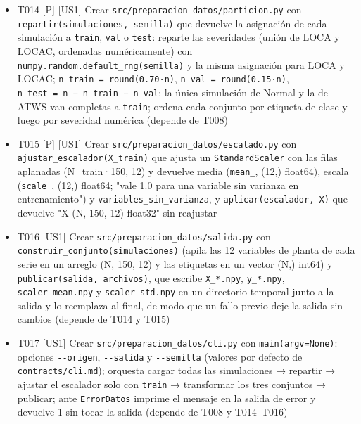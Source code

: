 \documentclass[12pt,a4paper]{article}
\providecommand{\tightlist}{\setlength{\itemsep}{0pt}\setlength{\parskip}{0pt}}
\newenvironment{documentogenerado}[2]{%
  \def\doccomando{#1}\def\docruta{#2}%
  \par\begingroup\small\setstretch{1.15}\sloppy%
}{\endgroup\par\medskip}
\begin{document}
\begin{documentogenerado}{/speckit-tasks (fase 7: /speckit-converge)}{specs\slash 001-preparacion-datos\slash tasks.md}
\begin{itemize}
\tightlist
\item[$\boxtimes$]
  T014 {[}P{]} {[}US1{]} Crear \texttt{src/\allowbreak{}preparacion\_\allowbreak{}datos/\allowbreak{}particion.\allowbreak{}py} con \texttt{repartir(simulaciones,\ semilla)} que devuelve la asignación de cada simulación a \texttt{train}, \texttt{val} o \texttt{test}: reparte las severidades (unión de LOCA y LOCAC, ordenadas numéricamente) con \texttt{numpy.\allowbreak{}random.\allowbreak{}default\_\allowbreak{}rng(semilla)} y la misma asignación para LOCA y LOCAC; \texttt{n\_\allowbreak{}train\ =\allowbreak{}\ round(0.\allowbreak{}70·n)}, \texttt{n\_\allowbreak{}val\ =\allowbreak{}\ round(0.\allowbreak{}15·n)}, \texttt{n\_\allowbreak{}test\ =\allowbreak{}\ n\ −\ n\_\allowbreak{}train\ −\ n\_\allowbreak{}val}; la única simulación de Normal y la de ATWS van completas a \texttt{train}; ordena cada conjunto por etiqueta de clase y luego por severidad numérica (depende de T008)
\item[$\boxtimes$]
  T015 {[}P{]} {[}US1{]} Crear \texttt{src/\allowbreak{}preparacion\_\allowbreak{}datos/\allowbreak{}escalado.\allowbreak{}py} con \texttt{ajustar\_\allowbreak{}escalador(X\_\allowbreak{}train)} que ajusta un \texttt{StandardScaler} con las filas aplanadas (N\_train·150, 12) y devuelve media (\texttt{mean\_}, (12,) float64), escala (\texttt{scale\_}, (12,) float64; "vale 1.0 para una variable sin varianza en entrenamiento") y \texttt{variables\_\allowbreak{}sin\_\allowbreak{}varianza}, y \texttt{aplicar(escalador,\ X)} que devuelve "X (N, 150, 12) float32" sin reajustar
\item[$\boxtimes$]
  T016 {[}US1{]} Crear \texttt{src/\allowbreak{}preparacion\_\allowbreak{}datos/\allowbreak{}salida.\allowbreak{}py} con \texttt{construir\_\allowbreak{}conjunto(simulaciones)} (apila las 12 variables de planta de cada serie en un arreglo (N, 150, 12) y las etiquetas en un vector (N,) int64) y \texttt{publicar(salida,\ archivos)}, que escribe \texttt{X\_\allowbreak{}*.\allowbreak{}npy}, \texttt{y\_\allowbreak{}*.\allowbreak{}npy}, \texttt{scaler\_\allowbreak{}mean.\allowbreak{}npy} y \texttt{scaler\_\allowbreak{}std.\allowbreak{}npy} en un directorio temporal junto a la salida y lo reemplaza al final, de modo que un fallo previo deje la salida sin cambios (depende de T014 y T015)
\item[$\boxtimes$]
  T017 {[}US1{]} Crear \texttt{src/\allowbreak{}preparacion\_\allowbreak{}datos/\allowbreak{}cli.\allowbreak{}py} con \texttt{main(argv=\allowbreak{}None)}: opciones \texttt{-\allowbreak{}\/\allowbreak{}-\allowbreak{}origen}, \texttt{-\allowbreak{}\/\allowbreak{}-\allowbreak{}salida} y \texttt{-\allowbreak{}\/\allowbreak{}-\allowbreak{}semilla} (valores por defecto de \texttt{contracts/\allowbreak{}cli.\allowbreak{}md}); orquesta cargar todas las simulaciones → repartir → ajustar el escalador solo con \texttt{train} → transformar los tres conjuntos → publicar; ante \texttt{ErrorDatos} imprime el mensaje en la salida de error y devuelve 1 sin tocar la salida (depende de T008 y T014--T016)

\end{itemize}
\end{documentogenerado}
\end{document}
